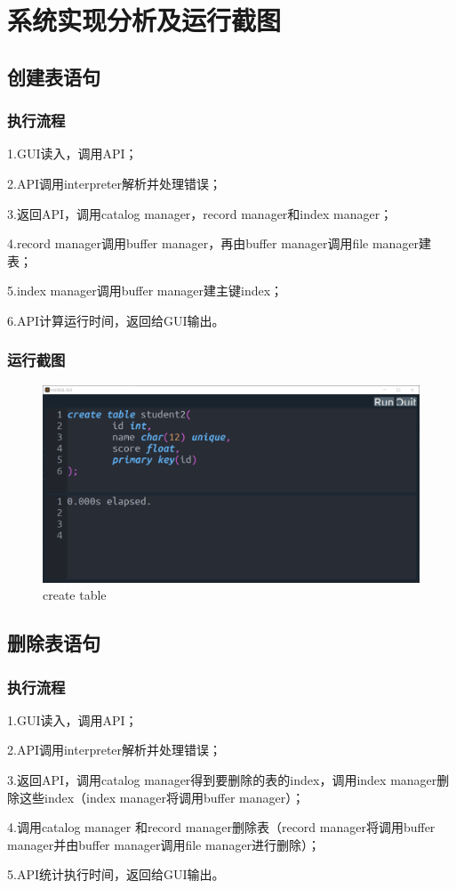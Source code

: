 \documentclass[UTF8]{ctexrep} %
\begin{document}
\chapter{系统实现分析及运行截图}
\section{创建表语句}
\subsection{执行流程}
1.GUI读入，调用API；
\par
2.API调用interpreter解析并处理错误；
\par
3.返回API，调用catalog manager，record manager和index manager；
\par
4.record manager调用buffer manager，再由buffer manager调用file manager建表；
\par
5.index manager调用buffer manager建主键index；
\par
6.API计算运行时间，返回给GUI输出。
\subsection{运行截图}
\begin{figure}[H]
    \centering
    \includegraphics[width=0.8\linewidth]{figure/1.1.png}
    \caption{create table}
    \label{fig:runtime1.1}
\end{figure}
\section{删除表语句}
\subsection{执行流程}
1.GUI读入，调用API；
\par
2.API调用interpreter解析并处理错误；
\par
3.返回API，调用catalog manager得到要删除的表的index，调用index manager删除这些index（index manager将调用buffer manager）；
\par
4.调用catalog manager 和record manager删除表（record manager将调用buffer manager并由buffer manager调用file manager进行删除）；
\par
5.API统计执行时间，返回给GUI输出。
\end{document}
